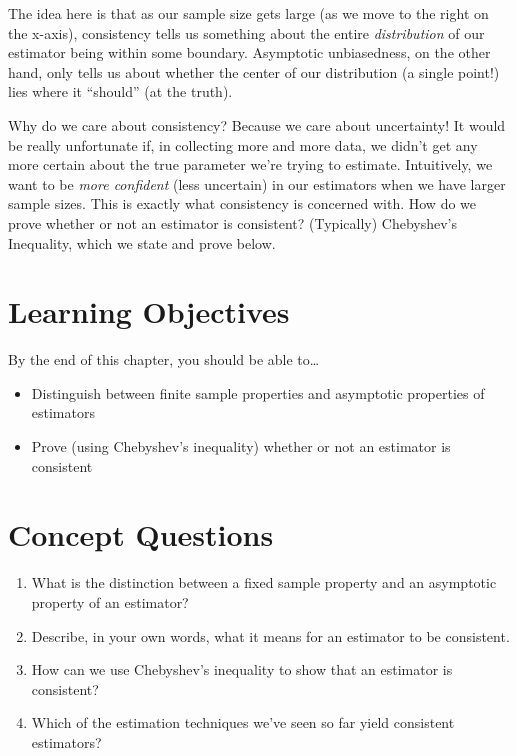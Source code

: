 \documentclass[
  letterpaper,
  DIV=11,
  numbers=noendperiod]{scrreprt}
\providecommand{\tightlist}{%
  \setlength{\itemsep}{0pt}\setlength{\parskip}{0pt}}\usepackage{longtable,booktabs,array}
\begin{document}
The idea here is that as our sample size gets large (as we move to the
right on the x-axis), consistency tells us something about the entire
\emph{distribution} of our estimator being within some boundary.
Asymptotic unbiasedness, on the other hand, only tells us about whether
the center of our distribution (a single point!) lies where it
``should'' (at the truth).

Why do we care about consistency? Because we care about uncertainty! It
would be really unfortunate if, in collecting more and more data, we
didn't get any more certain about the true parameter we're trying to
estimate. Intuitively, we want to be \emph{more confident} (less
uncertain) in our estimators when we have larger sample sizes. This is
exactly what consistency is concerned with. How do we prove whether or
not an estimator is consistent? (Typically) Chebyshev's Inequality,
which we state and prove below.

\section{Learning Objectives}\label{learning-objectives-4}

By the end of this chapter, you should be able to\ldots{}

\begin{itemize}
\tightlist
\item
  Distinguish between finite sample properties and asymptotic properties
  of estimators
\item
  Prove (using Chebyshev's inequality) whether or not an estimator is
  consistent
\end{itemize}

\section{Concept Questions}\label{concept-questions-4}

\begin{enumerate}
\def\labelenumi{\arabic{enumi}.}
\item
  What is the distinction between a fixed sample property and an
  asymptotic property of an estimator?
\item
  Describe, in your own words, what it means for an estimator to be
  consistent.
\item
  How can we use Chebyshev's inequality to show that an estimator is
  consistent?
\item
  Which of the estimation techniques we've seen so far yield consistent
  estimators?
\end{enumerate}
\end{document}
